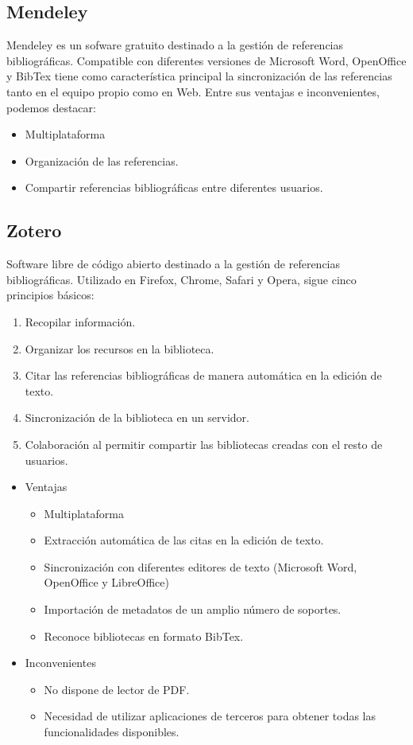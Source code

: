 \subsection{Mendeley}
Mendeley es un sofware  gratuito destinado a la gestión de referencias bibliográficas. Compatible con diferentes versiones de Microsoft Word, OpenOffice y BibTex tiene como característica principal la sincronización de las referencias tanto en el equipo  propio como en Web. \nocite{ucm:mendeley}
Entre sus ventajas e inconvenientes, podemos destacar: 
\begin{itemize}
\item Multiplataforma
\item Organización de las referencias. 
\item Compartir referencias bibliográficas entre diferentes usuarios. 

\end{itemize}
\subsection{Zotero}
Software libre de código abierto destinado a la gestión de referencias bibliográficas. \cite{bibl:zotero} Utilizado en Firefox, Chrome, Safari y Opera, sigue cinco principios básicos: 
\begin{enumerate}
\item Recopilar información. 
\item Organizar los recursos en la biblioteca. 
\item Citar las referencias bibliográficas de manera automática en la edición de texto. 
\item Sincronización de la biblioteca en un servidor. 
\item Colaboración al permitir compartir las bibliotecas creadas con el resto de usuarios. 
\end{enumerate}
\begin{itemize}
\item Ventajas
\begin{itemize}
\item Multiplataforma
\item Extracción automática de las citas en la edición de texto. 
\item Sincronización con diferentes editores de texto (Microsoft Word, OpenOffice y LibreOffice)\cite{wiki:Zotero}
\item Importación de metadatos de  un amplio número de soportes.
\item Reconoce bibliotecas en formato BibTex.
\end{itemize}
\end{itemize}
\begin{itemize}
\item Inconvenientes
\begin{itemize}
\item No dispone de lector de PDF. 
\item Necesidad de utilizar aplicaciones de terceros para obtener todas las funcionalidades disponibles. 
\end{itemize}
\end{itemize}
